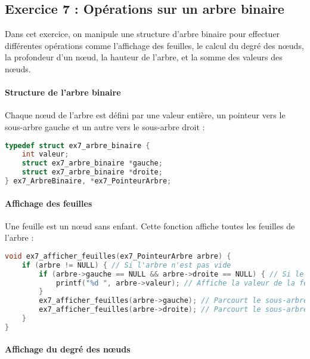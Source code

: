 \documentclass[a4paper,12pt]{article}
\begin{document}
\subsection{Exercice 7 : Opérations sur un arbre binaire}

Dans cet exercice, on manipule une structure d’arbre binaire pour effectuer différentes opérations comme l’affichage des feuilles, le calcul du degré des nœuds, la profondeur d’un nœud, la hauteur de l’arbre, et la somme des valeurs des nœuds.

\paragraph{Structure de l’arbre binaire}

Chaque nœud de l’arbre est défini par une valeur entière, un pointeur vers le sous-arbre gauche et un autre vers le sous-arbre droit :

\begin{lstlisting}[language=C, caption={Structure d’un nœud d’arbre}]
typedef struct ex7_arbre_binaire {
    int valeur;
    struct ex7_arbre_binaire *gauche;
    struct ex7_arbre_binaire *droite;
} ex7_ArbreBinaire, *ex7_PointeurArbre;
\end{lstlisting}

\paragraph{Affichage des feuilles}

Une feuille est un nœud sans enfant. Cette fonction affiche toutes les feuilles de l’arbre :

\begin{lstlisting}[language=C, caption={Affichage des feuilles}]
void ex7_afficher_feuilles(ex7_PointeurArbre arbre) {
    if (arbre != NULL) { // Si l'arbre n'est pas vide
        if (arbre->gauche == NULL && arbre->droite == NULL) { // Si le noeud est une feuille
            printf("%d ", arbre->valeur); // Affiche la valeur de la feuille
        }
        ex7_afficher_feuilles(arbre->gauche); // Parcourt le sous-arbre gauche
        ex7_afficher_feuilles(arbre->droite); // Parcourt le sous-arbre droit
    }
}
\end{lstlisting}

\paragraph{Affichage du degré des nœuds}
\end{document}
